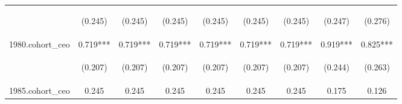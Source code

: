 \begin{center}
\begin{tabular}{lcccccccc}
\vspace{4pt} & \begin{footnotesize}(0.245)\end{footnotesize} & \begin{footnotesize}(0.245)\end{footnotesize} & \begin{footnotesize}(0.245)\end{footnotesize} & \begin{footnotesize}(0.245)\end{footnotesize} & \begin{footnotesize}(0.245)\end{footnotesize} & \begin{footnotesize}(0.245)\end{footnotesize} & \begin{footnotesize}(0.247)\end{footnotesize} & \begin{footnotesize}(0.276)\end{footnotesize} \\
1980.cohort\_ceo & 0.719*** & 0.719*** & 0.719*** & 0.719*** & 0.719*** & 0.719*** & 0.919*** & 0.825*** \\
\vspace{4pt} & \begin{footnotesize}(0.207)\end{footnotesize} & \begin{footnotesize}(0.207)\end{footnotesize} & \begin{footnotesize}(0.207)\end{footnotesize} & \begin{footnotesize}(0.207)\end{footnotesize} & \begin{footnotesize}(0.207)\end{footnotesize} & \begin{footnotesize}(0.207)\end{footnotesize} & \begin{footnotesize}(0.244)\end{footnotesize} & \begin{footnotesize}(0.263)\end{footnotesize} \\
1985.cohort\_ceo & 0.245 & 0.245 & 0.245 & 0.245 & 0.245 & 0.245 & 0.175 & 0.126 \\

\end{tabular}
\end{center}
